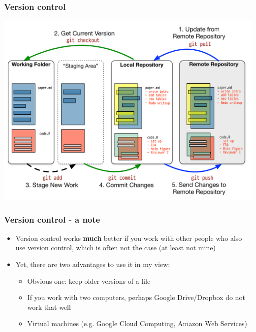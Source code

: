 \documentclass[aspectratio=43]{beamer}
\begin{document}
\begin{frame}
\frametitle{Version control}
\centering

\includegraphics[width = \textwidth]{img/git-basic}

\end{frame}

\begin{frame}
\frametitle{Version control - a note}
\centering

\begin{itemize}
  \item Version control works \textbf{much} better if you work with other people who also use version control, which is often not the case (at least not mine)
  \item Yet, there are two advantages to use it in my view:
  \begin{itemize}
    \item Obvious one: keep older versions of a file
    \item If you work with two computers, perhaps Google Drive/Dropbox do not work that well
    \item Virtual machines (e.g. Google Cloud Computing, Amazon Web Services)
  \end{itemize}
\end{itemize}

\end{frame}


\end{document}
